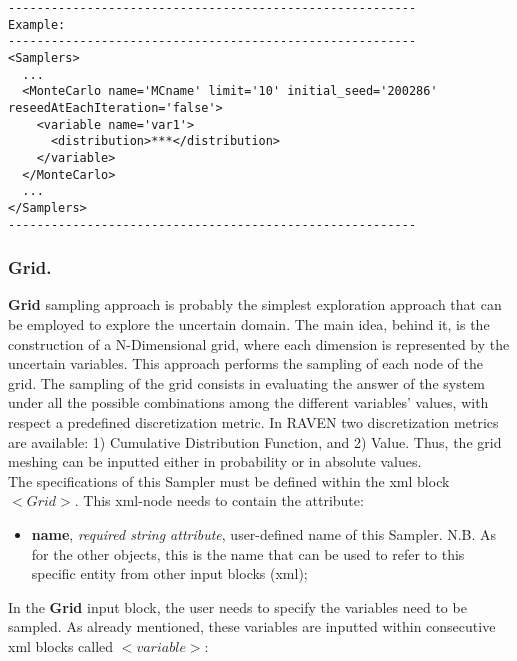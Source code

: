 \begin{lstlisting}[style=XML]
---------------------------------------------------------
Example:
---------------------------------------------------------
<Samplers>
  ...
  <MonteCarlo name='MCname' limit='10' initial_seed='200286' reseedAtEachIteration='false'> 
    <variable name='var1'> 
      <distribution>***</distribution> 	
    </variable> 
  </MonteCarlo>
  ...
</Samplers>
---------------------------------------------------------
\end{lstlisting}
\subsubsection{Grid.}
\label{subsubsubsec:Grid}
\textbf{Grid} sampling approach is probably the simplest exploration approach that can be employed to explore the uncertain domain. The main idea, behind it, is the construction of a N-Dimensional grid, where each dimension is represented by the uncertain variables. This approach performs the sampling of each node of the grid.  The sampling of the grid consists in evaluating the answer of the system under all the possible combinations among the different variables' values, with respect a predefined discretization metric.  In RAVEN two discretization metrics are available: 1) Cumulative Distribution Function, and 2) Value. Thus, the grid meshing can be inputted either in probability or in absolute values.
\\ The specifications of this Sampler must be defined within the xml block $<Grid>$. This xml-node needs to contain the attribute:
\begin{itemize}
\itemsep0em
\item \textbf{name}, \textit{required string attribute}, user-defined name of this Sampler. N.B. As for the other objects, this is the name that can be used to refer to this specific entity from other input blocks (xml);
\end{itemize}
In the \textbf{Grid} input block, the user needs to specify the variables need to be sampled. As already mentioned, these variables are inputted within consecutive xml blocks called $<variable>$:
